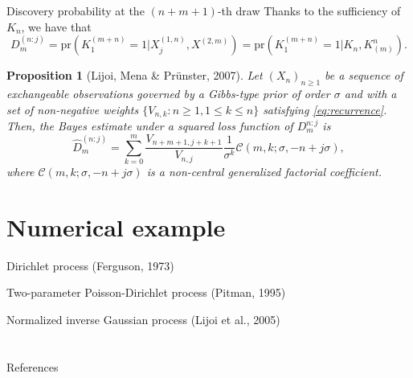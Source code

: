 \documentclass[11pt, handout]{beamer}
\newtheorem{proposition}{Proposition}
\begin{document}
\begin{frame}{Discovery probability at the \((n+m+1)\)-th draw}
    Thanks to the sufficiency of \(K_n\), we have that
    \begin{equation*}
        D_m^{(n:j)} = \text{pr}(K_1^{(m + n)} = 1 | X_j^{(1,n)}, X^{(2, m)}) = \text{pr}(K_1^{(m + n)} = 1 | K_n, K^n_{(m)}).
    \end{equation*}
    \begin{proposition}[Lijoi, Mena \& Pr{\"u}nster, 2007]
        Let \((X_n)_{n \geq 1}\) be a sequence of exchangeable observations governed by a Gibbs-type prior of order \(\sigma\) and with a set of non-negative weights \(\{V_{n, k} \colon n \geq 1, 1 \leq k \leq n\}\) satisfying \eqref{eq:recurrence}. Then, the Bayes estimate under a squared loss function of \(D_m^{n:j}\) is 
        \begin{equation*}
            \hat{D}_m^{(n:j)} = \sum_{k = 0}^m \frac{V_{n+m+1,j+k+1}}{V_{n,j}}\frac{1}{\sigma^k}\mathscr{C}(m, k; \sigma, -n + j\sigma),
        \end{equation*}
        where \(\mathscr{C}(m, k; \sigma, -n + j \sigma)\) is a non-central generalized factorial coefficient.
    \end{proposition}
\end{frame}

\section{Numerical example}

\begin{frame}{Dirichlet process (Ferguson, 1973)}
    
\end{frame}

\begin{frame}{Two-parameter Poisson-Dirichlet process (Pitman, 1995)}
    
\end{frame}

\begin{frame}{Normalized inverse Gaussian process (Lijoi et al., 2005)}
    
\end{frame}

\section*{}
\begin{frame}[allowframebreaks]{References} %
    \scriptsize{}
    
\end{frame}
 
\end{document}

